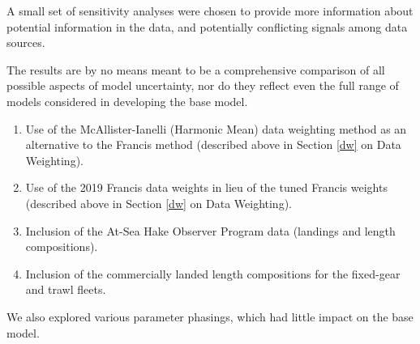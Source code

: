 \documentclass[11pt,
  english,
  a4paper,
]{article}
\begin{document}
\leavevmode\tagmcend\tagstructend\par

A small set of sensitivity analyses were chosen to provide more information about potential information in the data, and potentially conflicting signals among data sources.

The results are by no means meant to be a comprehensive comparison of all possible aspects of model uncertainty, nor do they reflect even the full range of models considered in developing the base model.

\begin{enumerate}
\item Use of the McAllister-Ianelli (Harmonic Mean) data weighting method as an alternative to the Francis method (described above in Section \ref{dw} on Data Weighting).
\item Use of the 2019 Francis data weights in lieu of the tuned Francis weights (described above in Section \ref{dw} on Data Weighting).
\item Inclusion of the At-Sea Hake Observer Program data (landings and length compositions).
\item Inclusion of the commercially landed length compositions for the fixed-gear and trawl fleets.
\end{enumerate}


We also explored various parameter phasings, which had little impact on the base model.

\leavevmode\tagmcend\tagstructend\par
\end{document}
